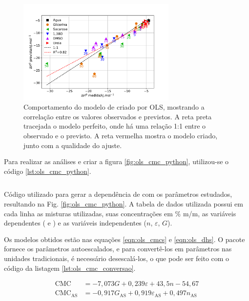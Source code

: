 		\begin{figure}[h]
			\centering
			\includegraphics[width=0.7\textwidth]{imagens/itc/ols_dh_python}
			\caption{Comportamento do modelo de \DHmic{} criado por OLS, mostrando a correlação entre os valores observados e previstos. A reta preta tracejada o modelo perfeito, onde há uma relação 1:1 entre o observado e o previsto. A reta vermelha mostra o modelo criado, junto com a qualidade do ajuste.}
			\label{fig:ols_dh_python}
		\end{figure}

		Para realizar as análises e criar a figura \ref{fig:ols_cmc_python}, utilizou-se o código \ref{lst:ols_cmc_python}.
		
		\begin{listing}[h]
			\inputminted{python}{./python/ols_cmc_statsmodels.py}
			\caption{Código utilizado para gerar a dependência de \cmc{} com os parâmetros estudados, resultando na Fig. \ref{fig:ols_cmc_python}. A tabela de dados utilizada possui em cada linha as misturas utilizadas, suas concentrações em \% m/m, as variáveis dependentes (\cmc{} e \DHmic) e as variáveis independentes (\(n\), \(\varepsilon\), \(G\)).}
			\label{lst:ols_cmc_python}
		\end{listing}
		
		Os modelos obtidos estão nas equações \ref{eqn:ols_cmcs} e \ref{eqn:ols_dhs}. O pacote fornece os parâmetros autoescalados, e para convertê-los em parâmetros nas unidades tradicionais, é necessário desescalá-los, o que pode ser feito com o código da listagem \ref{lst:ols_cmc_conversao}.
		
		\begin{subequations}
			\begin{align}
			\textrm{CMC}               & = -7,073G              + 0,239\varepsilon             + 43,5n              -54,67  \label{eqn:ols_cmc}     \\
			\textrm{CMC}_{\textrm{AS}} & = -0,917G_\textrm{AS}  + 0,919\varepsilon_\textrm{AS} +0,497n_\textrm{AS}          \label{eqn:ols_cmc_AS}
			\end{align}
			\label{eqn:ols_cmcs}
		\end{subequations}
		
